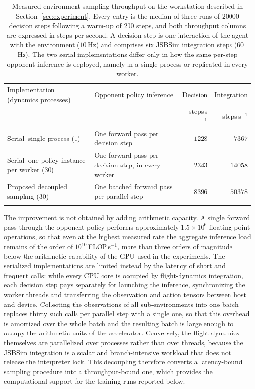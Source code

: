\documentclass[pdflatex,sn-mathphys-num]{sn-jnl}%
\theoremstyle{thmstyleone}%
\theoremstyle{thmstyletwo}%
\theoremstyle{thmstylethree}%
\begin{document}
\begin{table}[t]
\caption{Measured environment sampling throughput on the workstation described in Section~\ref{sec:experiment}. Every entry is the median of three runs of $20000$ decision steps following a warm-up of $200$ steps, and both throughput columns are expressed in steps per second. A decision step is one interaction of the agent with the environment ($10$\,Hz) and comprises six JSBSim integration steps ($60$\,Hz). The two serial implementations differ only in how the same per-step opponent inference is deployed, namely in a single process or replicated in every worker.}\label{tab:throughput}%
\footnotesize
\begin{tabular*}{\textwidth}{@{\extracolsep\fill}p{}p{}rr@{}}
\toprule
Implementation (dynamics processes) & Opponent policy inference & Decision & Integration \\
 & & steps\,s$^{-1}$ & steps\,s$^{-1}$ \\
\midrule
Serial, single process ($1$) & One forward pass per decision step & $1228$ & $7367$ \\
Serial, one policy instance per worker ($30$) & One forward pass per decision step, in every worker & $2343$ & $14058$ \\
Proposed decoupled sampling ($30$) & One batched forward pass per parallel step & $8396$ & $50378$ \\
\botrule
\end{tabular*}
\end{table}

The improvement is not obtained by adding arithmetic capacity. A single forward pass through the opponent policy performs approximately $1.5\times10^{6}$ floating-point operations, so that even at the highest measured rate the aggregate inference load remains of the order of $10^{10}$\,FLOP\,s$^{-1}$, more than three orders of magnitude below the arithmetic capability of the GPU used in the experiments. The serialized implementations are limited instead by the latency of short and frequent calls: while every CPU core is occupied by flight-dynamics integration, each decision step pays separately for launching the inference, synchronizing the worker threads and transferring the observation and action tensors between host and device. Collecting the observations of all sub-environments into one batch replaces thirty such calls per parallel step with a single one, so that this overhead is amortized over the whole batch and the resulting batch is large enough to occupy the arithmetic units of the accelerator. Conversely, the flight dynamics themselves are parallelized over processes rather than over threads, because the JSBSim integration is a scalar and branch-intensive workload that does not release the interpreter lock. This decoupling therefore converts a latency-bound sampling procedure into a throughput-bound one, which provides the computational support for the training runs reported below.
\end{document}
